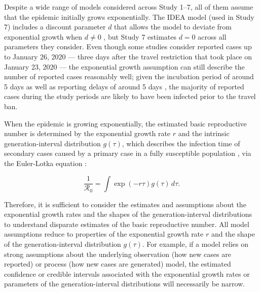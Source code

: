 \documentclass[12pt]{article}
\newcommand{\Ro}{\ensuremath{{\mathcal R}_{0}}\xspace}
\begin{document}
Despite a wide range of models considered across Study 1--7, all of them assume that the epidemic initially grows exponentially.
The IDEA model (used in Study 7) includes a discount parameter $d$ that allows the model to deviate from exponential growth when $d \neq 0$ \citep{fisman2013idea}, but Study 7 estimates $d=0$ across all parameters they consider.
Even though some studies consider reported cases up to January 26, 2020 --- three days after the travel restriction that took place on January 23, 2020 \citep{Tianeabb6105} --- the exponential growth assumption can still describe the number of reported cases reasonably well;
given the incubation period of around 5 days \citep{lauer2020incubation} as well as reporting delays of around 5 days \citep{sun2020early}, the majority of reported cases during the study periods are likely to have been infected prior to the travel ban.

When the epidemic is growing exponentially, the estimated basic reproductive number is determined by the exponential growth rate $r$ and the intrinsic generation-interval distribution $g(\tau)$, which describes the infection time of secondary cases caused by a primary case in a fully susceptible population \citep{champredon2015intrinsic}, via the Euler-Lotka equation \citep{wallinga2007generation}:
\begin{linenomath*}
\begin{equation}
\frac{1}{\Ro} = \int \exp(-r\tau) g(\tau) \, d\tau.
\label{eq:euler}
\end{equation}
\end{linenomath*}
Therefore, it is sufficient to consider the estimates and assumptions about the exponential growth rates and the shapes of the generation-interval distributions to understand disparate estimates of the basic reproductive number.
All model assumptions reduce to properties of the exponential growth rate $r$ and the shape of the generation-interval distribution $g(\tau)$.
For example, if a model relies on strong assumptions about the underlying observation (how new cases are reported) or process (how new cases are generated) model, the estimated confidence or credible intervals associated with the exponential growth rates or parameters of the generation-interval distributions will necessarily be narrow.
\end{document}
